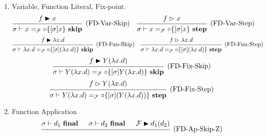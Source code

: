 \documentclass{article}
\newcommand{\entails}{\mathrel{\mathop{\vdash}}}
\newcommand{\steps}{\mathrel{\mathop{\vartriangleright}}}
\newcommand{\skips}{\mathrel{\mathop{\blacktriangleright}}}
\newcommand{\final}{~\mathbf{final}}
\newcommand{\istep}{~\mathbf{step}}
\newcommand{\iskip}{~\mathbf{skip}}
\begin{document}
\begin{enumerate}
\begin{enumerate}
      \item Variable, Function Literal, Fix-point.
        \[
          \begin{prooftree}
            \hypo{f \skips x}
            \infer1[(FD-Var-Skip)]{\sigma \entails x =_\mathcal{F} \circ
            \{ [\sigma]x \} \iskip}
          \end{prooftree}
          \quad
          \begin{prooftree}
            \hypo{f \steps x}
            \infer1[(FD-Var-Step)]{
              \sigma \entails
              x =_\mathcal{F} \circ \{ [\sigma]x \} \istep
            }
          \end{prooftree}
        \]
        \[
          \begin{prooftree}
            \hypo{f \skips \lambda x . d}
            \infer1[(FD-Fun-Skip)]{
              \sigma \entails
              \lambda x . d
              =_\mathcal{F}
              \circ \{[\sigma](\lambda x . d)\} \iskip
            }
          \end{prooftree}
          \quad
          \begin{prooftree}
            \hypo{f \steps \lambda x . d}
            \infer1[(FD-Fun-Step)]{
              \sigma \entails
              \lambda x . d
              =_\mathcal{F}
              \circ \{[\sigma](\lambda x . d)\} \istep
            }
          \end{prooftree}
        \]
        \[
          \begin{prooftree}
            \hypo{f \skips Y (\lambda x . d)}
            \infer1[(FD-Fix-Skip)]{
              \sigma \entails
              Y (\lambda x . d)
              =_\mathcal{F}
              \circ \{ [\sigma] Y (\lambda x . d) \} \iskip
            }
          \end{prooftree}
        \]
        \[
          \begin{prooftree}
            \hypo{f \steps Y (\lambda x . d)}
            \infer1[(FD-Fix-Step)]{
              \sigma \entails
              Y (\lambda x . d)
              =_\mathcal{F}
              \circ \{ [\sigma] (Y (\lambda x . d)) \} \istep
            }
          \end{prooftree}
        \]
      \item Function Application
        \[
          \begin{prooftree}
            \hypo{\sigma \entails d_1 \final}
            \hypo{\sigma \entails d_2 \final}
            \hypo{\mathcal{F} \skips d_1(d_2)}
            \infer3[(FD-Ap-Skip-Z)]{
}
\end{prooftree}\]
\end{enumerate}
\end{enumerate}
\end{document}
